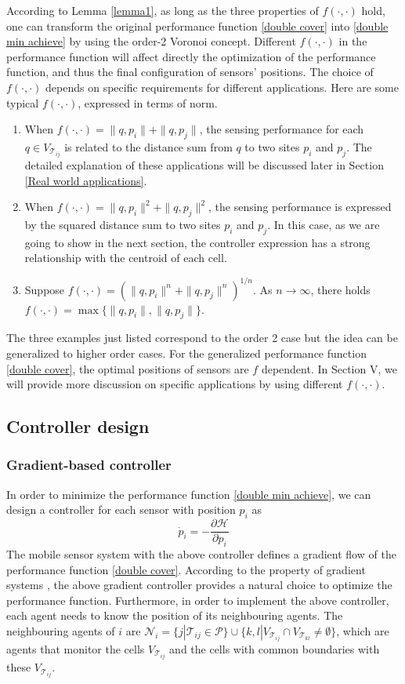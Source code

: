 \documentclass[letterpaper, 10 pt, conference]{ieeeconf}
\begin{document}
According to Lemma \ref{lemma1}, as long as the three properties of $f(\cdot,\cdot)$ hold, one can transform the original performance function \eqref{double cover} into \eqref{double min achieve} by using the order-2 Voronoi concept.
Different $f(\cdot,\cdot)$ in the performance function will affect directly the optimization of the performance function, and thus the final configuration of sensors' positions.
The choice of $f(\cdot,\cdot)$ depends on specific requirements for different applications. Here are some typical $f(\cdot,\cdot)$, expressed in terms of norm.
\begin{enumerate}
  \item When $f(\cdot,\cdot)=\|q,p_i\|+\|q,p_j\|$, the sensing performance for each $q\in V_{\mathcal{T}_{ij}}$ is related to the distance sum from $q$ to two sites $p_i$ and $p_j$.  The detailed explanation of these applications will be discussed later in Section \ref{Real world applications}.
  \item When $f(\cdot,\cdot)=\|q,p_i\|^2+\|q,p_j\|^2$, the sensing performance is expressed by the squared distance sum to two sites $p_i$ and $p_j$.  In this case, as we are going to show in the next section, the controller expression has a strong relationship with the centroid of each cell.
  \item Suppose $f(\cdot,\cdot)=(\|q,p_i\|^n+\|q,p_j\|^n)^{1/n}$. As $n\rightarrow \infty$, there holds $f(\cdot,\cdot)=\max\{\|q,p_i\|,\|q,p_j\|\}$.
\end{enumerate}
The three examples just listed correspond to the order 2 case but the idea can be generalized to higher order cases.
For the generalized performance function \eqref{double cover}, the optimal positions of sensors are $f$ dependent. In Section V, we will provide more discussion on specific applications by using different  $f(\cdot,\cdot)$.

\subsection{Controller design}


\subsubsection{Gradient-based controller}
\label{Gradient-based controller}
In order to minimize the performance function \eqref{double min achieve}, we can design a controller for each sensor with position $p_i$ as
$$ \dot p_i=-\frac{\partial \mathcal{H}}{\partial {p_i}}$$
The mobile sensor system with the above controller defines a gradient flow of the performance function \eqref{double cover}. According to the property of  gradient systems \cite{absil2006stable}, the above gradient controller provides a natural choice to optimize the performance function.
Furthermore, in order to implement the above controller, each agent needs to know the position of its neighbouring agents.
The neighbouring agents of $i$ are $\mathcal{N}_i = \{j|\mathcal{T}_{ij}\in \mathcal{P}\}\cup\{k,l|V_{\mathcal{T}_{ij}}\cap V_{\mathcal{T}_{kl}} \neq \emptyset \}$, which are agents that monitor the cells $V_{\mathcal{T}_{ij}}$ and the cells with common boundaries with these $V_{\mathcal{T}_{ij}}$.
\end{document}
